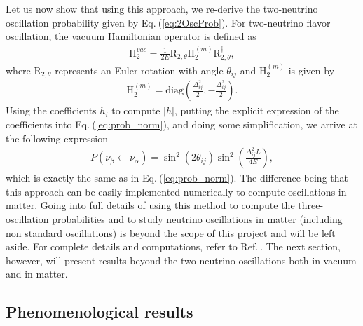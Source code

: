 \documentclass[twocolumn,secnumarabic,amssymb, nobibnotes, aps, prd,10pt]{revtex4-1}
\newcommand{\Eq}[1]{Eq.$\:$(\ref{#1})}
\newcommand{\myref}[1]{Ref.$\:$\cite{#1}}
\begin{document}
Let us now show that using this approach, we re-derive the two-neutrino oscillation
probability given by \Eq{eq:2OscProb}. For two-neutrino flavor oscillation, the vacuum
Hamiltonian operator is defined as
\begin{align}
\mathrm{H}_2^{vac} = \frac{1}{2 E} \mathrm{R}_{2, \theta} \mathrm{H}^{(m)}_2 
\mathrm{R}_{2, \theta}^\dagger ,
\end{align}
where $\mathrm{R}_{2, \theta}$ represents an Euler rotation with angle $\theta_{ij}$
and $\mathrm{H}^{(m)}_2$ is given by 
\begin{align}
\mathrm{H}^{(m)}_2 = \mathrm{diag} \left( \frac{\Delta_{ij}^2}{2}, - \frac{\Delta_{ij}^2}{2} \right). 
\end{align}
Using the coefficients $h_i$ to compute $\vert h \vert$, putting the explicit expression 
of the coefficients into \Eq{eq:prob_norm}, and doing some simplification, we arrive at 
the following expression
\begin{align}
P (\nu_\beta \longleftarrow \nu_\alpha) = \sin^2 (2 \theta_{ij}) \sin^2 \left(
\frac{\Delta_{ij}^2 L}{4 E} \right) ,
\end{align} 
which is exactly the same as in \Eq{eq:prob_norm}. The difference being that this approach
can be easily implemented numerically to compute oscillations in matter. Going into full
details of using this method to compute the three-oscillation probabilities and to study
neutrino oscillations in matter (including non standard oscillations) is beyond the scope of 
this project and will be left aside. For complete details and computations, refer to 
\myref{Bustamante:2019ggq}. The next section, however, will present results beyond the 
two-neutrino oscillations both in vacuum and in matter.


\subsection{Phenomenological results}
\label{subsec:results}
\end{document}
